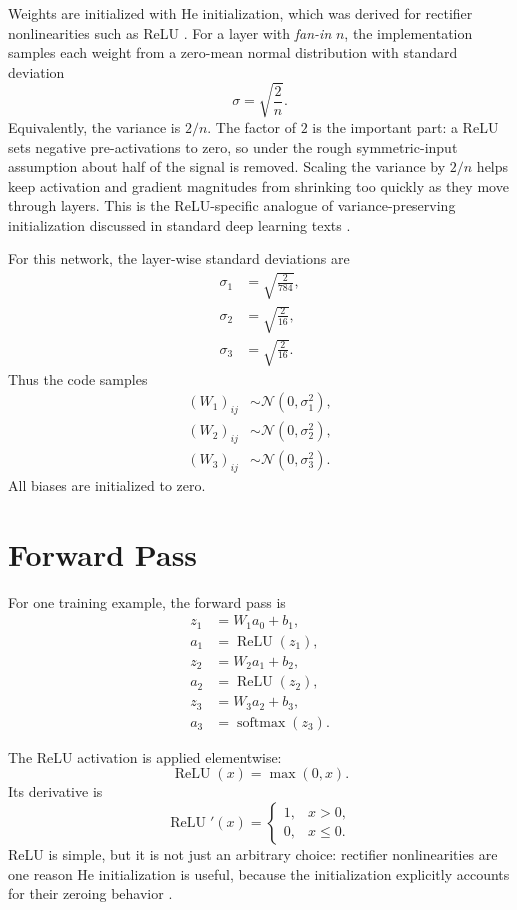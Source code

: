 \documentclass[11pt]{article}
\newcommand{\relu}{\operatorname{ReLU}}
\newcommand{\softmax}{\operatorname{softmax}}
\begin{document}
Weights are initialized with He initialization, which was derived for rectifier
nonlinearities such as ReLU \cite{he2015rectifiers}. For a layer with
\emph{fan-in} $n$, the implementation samples each weight from a zero-mean normal
distribution with standard deviation
\[
    \sigma = \sqrt{\frac{2}{n}}.
\]
Equivalently, the variance is $2/n$. The factor of $2$ is the important part: a
ReLU sets negative pre-activations to zero, so under the rough symmetric-input
assumption about half of the signal is removed. Scaling the variance by $2/n$
helps keep activation and gradient magnitudes from shrinking too quickly as they
move through layers. This is the ReLU-specific analogue of variance-preserving
initialization discussed in standard deep learning texts \cite{goodfellow2016deep}.

For this network, the layer-wise standard deviations are
\[
\begin{aligned}
    \sigma_1 &= \sqrt{\frac{2}{784}}, \\
    \sigma_2 &= \sqrt{\frac{2}{16}}, \\
    \sigma_3 &= \sqrt{\frac{2}{16}}.
\end{aligned}
\]
Thus the code samples
\[
\begin{aligned}
    (W_1)_{ij} &\sim \mathcal{N}(0, \sigma_1^2), \\
    (W_2)_{ij} &\sim \mathcal{N}(0, \sigma_2^2), \\
    (W_3)_{ij} &\sim \mathcal{N}(0, \sigma_3^2).
\end{aligned}
\]
All biases are initialized to zero.

\section{Forward Pass}

For one training example, the forward pass is
\[
\begin{aligned}
    z_1 &= W_1 a_0 + b_1, \\
    a_1 &= \relu(z_1), \\
    z_2 &= W_2 a_1 + b_2, \\
    a_2 &= \relu(z_2), \\
    z_3 &= W_3 a_2 + b_3, \\
    a_3 &= \softmax(z_3).
\end{aligned}
\]

The ReLU activation is applied elementwise:
\[
    \relu(x) = \max(0, x).
\]
Its derivative is
\[
    \relu'(x) =
    \begin{cases}
        1, & x > 0, \\
        0, & x \le 0.
    \end{cases}
\]
ReLU is simple, but it is not just an arbitrary choice: rectifier nonlinearities
are one reason He initialization is useful, because the initialization explicitly
accounts for their zeroing behavior \cite{he2015rectifiers}.
\end{document}
